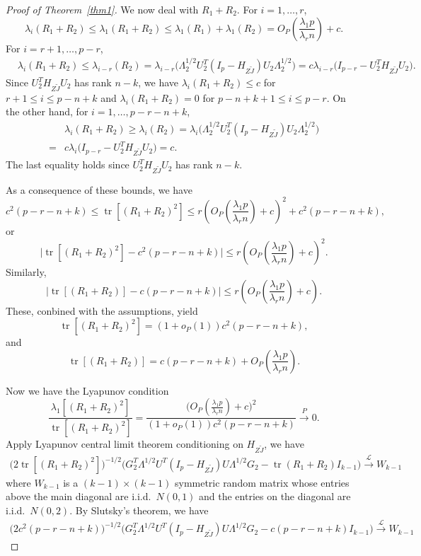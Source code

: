 \documentclass[review]{elsarticle}
\DeclareMathOperator{\mytr}{tr}
\theoremstyle{plain}
\theoremstyle{definition}
\theoremstyle{remark}
\begin{document}
\begin{proof}[\textrm{Proof of Theorem~\ref{thm1}}]
We now deal with $R_1+R_2$.
For $i=1,\ldots, r$,
$$
\lambda_i(R_1+R_2)\leq
\lambda_1(R_1+R_2)\leq \lambda_1(R_1)+\lambda_1(R_2)= O_P(\frac{\lambda_1 p}{\lambda_r n}) + c.
$$
For $i=r+1,\ldots, p-r$,
$$
\begin{aligned}
&\lambda_i(R_1+R_2)\leq \lambda_{i-r}(R_2)
=
 \lambda_{i-r}\big( \Lambda_2^{1/2} U_2^T (I_p-H_{Z\tilde{J}})U_2\Lambda_2^{1/2}\big)
    =c\lambda_{i-r}\big( I_{p-r}-U_2^T H_{Z\tilde{J}} U_2\big).
\end{aligned}
$$
Since $U_2^T H_{Z\tilde{J}} U_2$ has rank $n-k$, we have $\lambda_i (R_1+R_2)\leq c$ for $r+1\leq i \leq p-n+k$ and $\lambda_i (R_1+R_2)=0$ for $p-n+k+1\leq i \leq p-r$.
On the other hand, for $i=1,\ldots, p-r-n+k$,
$$
\begin{aligned}
&\lambda_i(R_1+R_2)\geq \lambda_i(R_2)
=
 \lambda_i\big( \Lambda_2^{1/2} U_2^T (I_p-H_{Z\tilde{J}})U_2\Lambda_2^{1/2}\big)\\
=&
    c\lambda_i\big( I_{p-r}-  U_2^T H_{Z\tilde{J}}U_2 \big)
    =c.
\end{aligned}
$$
The last equality holds since $U_2^T H_{Z\tilde{J}}U_2$ has rank $n-k$.

As a consequence of these bounds, we have
$$
c^2(p-r-n+k)\leq \mytr [(R_1+R_2)^2]\leq  r(O_P(\frac{\lambda_1 p}{\lambda_r n})+c)^2+c^2(p-r-n+k),
$$
or
$$
\big| \mytr [(R_1+R_2)^2]- c^2(p-r-n+k) \big|\leq 
r(O_P(\frac{\lambda_1 p}{\lambda_r n})+c)^2.
$$
Similarly,
$$
\big| \mytr [(R_1+R_2)]-c(p-r-n+k)\big|\leq 
r(O_P(\frac{\lambda_1 p}{\lambda_r n})+c).
$$
These, conbined with the assumptions, yield
$$
 \mytr [(R_1+R_2)^2]=(1+o_P(1))c^2(p-r-n+k),
$$
and
$$
 \mytr [(R_1+R_2)]=c(p-r-n+k)+O_P(\frac{\lambda_1 p}{\lambda_r n}).
$$

Now we have the Lyapunov condition
$$
\frac{\lambda_1[(R_1+R_2)^2]}{
\mytr [(R_1+R_2)^2]
}
=
\frac{
\big( O_P(\frac{\lambda_1 p}{\lambda_r n})+c\big)^2
}{
(1+o_P(1))c^2(p-r-n+k)
}
\xrightarrow{P} 0.
$$
Apply Lyapunov central limit theorem conditioning on $H_{Z\tilde{J}}$, we have
$$
\begin{aligned}
\big(2\mytr[(R_1+R_2)^2]\big)^{-1/2}
\big( G_2^T \Lambda^{1/2}U^T (I_p-H_{Z\tilde{J}})U\Lambda^{1/2}G_2-\mytr(R_1+R_2) I_{k-1} \big)
\xrightarrow{\mathcal{L}} W_{k-1}
\end{aligned}
$$
where $W_{k-1}$ is a $(k-1)\times(k-1)$ symmetric random matrix whose entries above the main diagonal are i.i.d.\ $N(0,1)$ and the entries on the diagonal are i.i.d.\ $N(0,2)$.
By Slutsky's theorem, we have
$$
\begin{aligned}
    \big(2c^2(p-r-n+k)\big)^{-1/2}
    \big( G_2^T \Lambda^{1/2}U^T (I_p-H_{Z\tilde{J}})U\Lambda^{1/2}G_2-c(p-r-n+k)I_{k-1} \big)
\xrightarrow{\mathcal{L}}W_{k-1}
\end{aligned}
$$



\end{proof}
\end{document}
